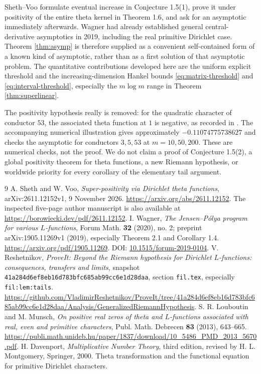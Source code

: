 \documentclass[11pt]{article}
\begin{document}
Sheth--Voo \cite{SV} formulate eventual increase in Conjecture 1.5(1), prove it under positivity of the entire theta kernel in Theorem 1.6, and ask for an asymptotic immediately afterwards. Wagner \cite{Wagner} had already established general central-derivative asymptotics in 2019, including the real primitive Dirichlet case. Theorem \ref{thm:asymp} is therefore supplied as a convenient self-contained form of a known kind of asymptotic, rather than as a first solution of that asymptotic problem. The quantitative contributions developed here are the uniform explicit threshold and the increasing-dimension Hankel bounds \eqref{eq:matrix-threshold} and \eqref{eq:interval-threshold}, especially the $m\log m$ range in Theorem \ref{thm:superlinear}.

The positivity hypothesis really is removed: for the quadratic character of conductor $53$, the associated theta function at $1$ is negative, as recorded in \cite[Section 1.1]{LM}. The accompanying numerical illustration gives approximately $-0.11074775738627$ and checks the asymptotic for conductors $3,5,53$ at $m=10,50,200$. These are numerical checks, not the proof. We do not claim a proof of Conjecture 1.5(2), a global positivity theorem for theta functions, a new Riemann hypothesis, or worldwide priority for every corollary of the elementary tail argument.

\begingroup\footnotesize
\begin{thebibliography}{9}
\setlength{\itemsep}{3pt}
 A. Sheth and W. Voo, \emph{Super-positivity via Dirichlet theta functions}, arXiv:2611.12152v1, 9 November 2026. \url{https://arxiv.org/abs/2611.12152}. The inspected five-page author manuscript is also available at \url{https://borowiecki.dev/pdf/2611.12152}.
 I. Wagner, \emph{The Jensen--P\'olya program for various $L$-functions}, Forum Math. \textbf{32} (2020), no. 2; preprint arXiv:1905.11269v1 (2019), especially Theorem 2.1 and Corollary 1.4. \url{https://arxiv.org/pdf/1905.11269}. DOI: \href{https://doi.org/10.1515/forum-2019-0104}{10.1515/forum-2019-0104}.
 V. Reshetnikov, \emph{ProveIt: Beyond the Riemann hypothesis for Dirichlet $L$-functions: consequences, transfers and limits}, snapshot \texttt{41a284d6ef8eb16d783bfc685ab99cc6e1d28daa}, section \texttt{fil.tex}, especially \texttt{fil:lem:tails}. \url{https://github.com/VladimirReshetnikov/ProveIt/tree/41a284d6ef8eb16d783bfc685ab99cc6e1d28daa/Analysis/GeneralizedRiemannHypothesis}.
 S. R. Louboutin and M. Munsch, \emph{On positive real zeros of theta and $L$-functions associated with real, even and primitive characters}, Publ. Math. Debrecen \textbf{83} (2013), 643--665. \url{https://publi.math.unideb.hu/paper/1837/download/10_5486_PMD_2013_5670.pdf}.
 H. Davenport, \emph{Multiplicative Number Theory}, third edition, revised by H. L. Montgomery, Springer, 2000. Theta transformation and the functional equation for primitive Dirichlet characters.
\end{thebibliography}
\endgroup
\end{document}
